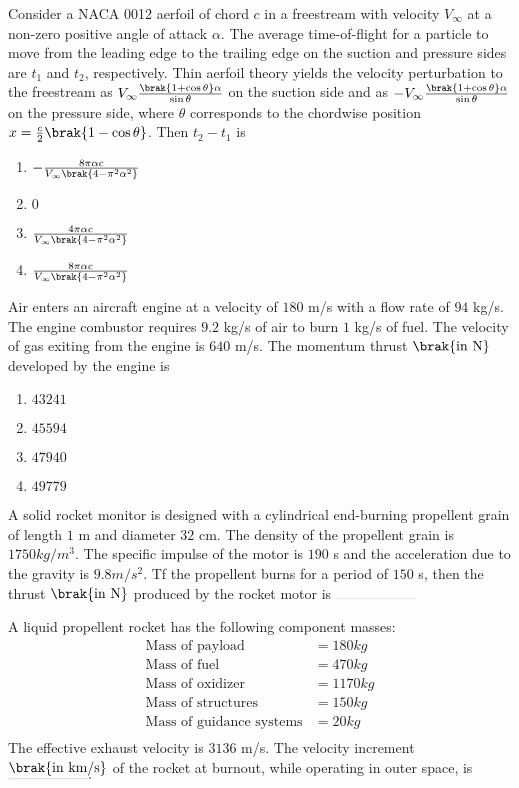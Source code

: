 \item Consider a NACA 0012 aerfoil of chord $c$ in a freestream with velocity $V_\infty$ at a non-zero positive angle of attack $\alpha$. The average time-of-flight for a particle to move from the leading edge to the trailing edge on the suction and pressure sides are $t_1$ and $t_2$, respectively. Thin aerfoil theory yields the velocity perturbation to the freestream as $V_\infty\frac{\brak{1 + \cos\theta}\alpha}{\sin\theta}$ on the suction side and as $-V_\infty\frac{\brak{1 + \cos\theta}\alpha}{\sin\theta}$ on the pressure side, where $\theta$ corresponds to the chordwise position $x = \frac{c}{2}\brak{1-\cos\theta}$. Then $t_2 - t_1$ is
\hfill{}
\begin{enumerate}
\item $-\frac{8\pi\alpha c}{V_\infty \brak{4 - \pi^{2}\alpha^{2}}}$
\item $0$ 
\item $\frac{4\pi\alpha c}{V_\infty \brak{4 - \pi^{2}\alpha^{2}}}$
\item $\frac{8\pi\alpha c}{V_\infty \brak{4 - \pi^{2}\alpha^{2}}}$
\end{enumerate}

\item Air enters an aircraft engine at a velocity of $180$ m/s with a flow rate of $94$ kg/s. The engine combustor requires $9.2$ kg/s of air to burn $1$ kg/s of fuel. The velocity of gas exiting from the engine is $640$ m/s. The momentum thrust $\brak{\text{in N}}$ developed by the engine is
\hfill{}
\begin{enumerate}
\item $43241$
\item $45594$
\item $47940$
\item $49779$
\end{enumerate}

\item A solid rocket monitor is designed with a cylindrical end-burning propellent grain of length $1$ m and diameter $32$ cm. The density of the propellent grain is $1750 kg/m^3$. The specific impulse of the motor is $190$ s and the acceleration due to the gravity is $9.8 m/s^2$. Tf the propellent burns for a period of $150$ s, then the thrust $\brak{\text{in N}}$ produced by the rocket motor is $\rule{2cm}{0.1pt}$
\hfill{}

\item A liquid propellent rocket has the following component masses:
\begin{align*}
\text{Mass of payload} &= 180 kg\\
\text{Mass of fuel} &= 470 kg\\
\text{Mass of oxidizer} &= 1170 kg\\
\text{Mass of structures} &= 150 kg\\
\text{Mass of guidance systems} &= 20 kg\\
\end{align*}
The effective exhaust velocity is $3136$ m/s. The velocity increment $\brak{\text{in km/s}}$ of the rocket at burnout, while operating in outer space, is $\rule{2cm}{0.1pt}.$
\hfill{}

